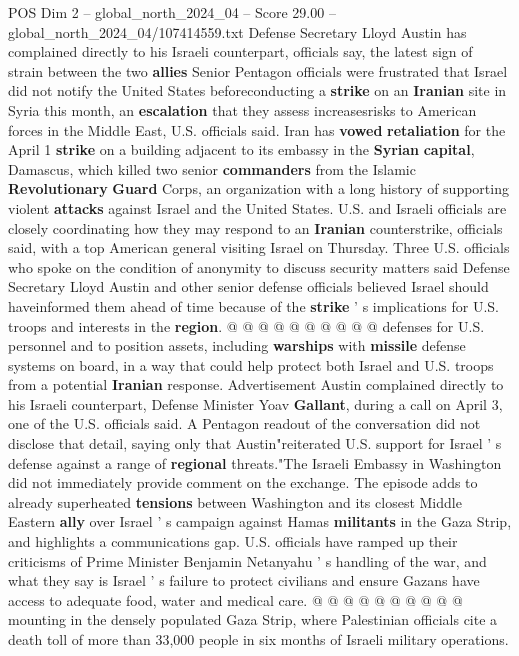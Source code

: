\begin{textsample}{POS Dim 2 – global\_north\_2024\_04 – Score 29.00 – global\_north\_2024\_04/107414559.txt}  \label{ex:f2_pos_167}
Defense Secretary Lloyd Austin has complained directly to his Israeli counterpart, officials say, the latest sign of strain between the two \textbf{allies} Senior Pentagon officials were frustrated that Israel did not notify the United States beforeconducting a \textbf{strike} on an \textbf{Iranian} site in Syria this month, an \textbf{escalation} that they assess increasesrisks to American forces in the Middle East, U.S. officials said.
Iran has \textbf{vowed} \textbf{retaliation} for the April 1 \textbf{strike} on a building adjacent to its embassy in the \textbf{Syrian} \textbf{capital}, Damascus, which killed two senior \textbf{commanders} from the Islamic \textbf{Revolutionary} \textbf{Guard} Corps, an organization with a long history of supporting violent \textbf{attacks} against Israel and the United States.
U.S. and Israeli officials are closely coordinating how they may respond to an \textbf{Iranian} counterstrike, officials said, with a top American general visiting Israel on Thursday.
Three U.S. officials who spoke on the condition of anonymity to discuss security matters said Defense Secretary Lloyd Austin and other senior defense officials believed Israel should haveinformed them ahead of time because of the \textbf{strike} ' s implications for U.S. troops and interests in the \textbf{region}. @ @ @ @ @ @ @ @ @ @ defenses for U.S. personnel and to position assets, including \textbf{warships} with \textbf{missile} defense systems on board, in a way that could help protect both Israel and U.S. troops from a potential \textbf{Iranian} response.
Advertisement Austin complained directly to his Israeli counterpart, Defense Minister Yoav \textbf{Gallant}, during a call on April 3, one of the U.S. officials said.
A Pentagon readout of the conversation did not disclose that detail, saying only that Austin"reiterated U.S. support for Israel ' s defense against a range of \textbf{regional} threats."The Israeli Embassy in Washington did not immediately provide comment on the exchange.
The episode adds to already superheated \textbf{tensions} between Washington and its closest Middle Eastern \textbf{ally} over Israel ' s campaign against Hamas \textbf{militants} in the Gaza Strip, and highlights a communications gap.
U.S. officials have ramped up their criticisms of Prime Minister Benjamin Netanyahu ' s handling of the war, and what they say is Israel ' s failure to protect civilians and ensure Gazans have access to adequate food, water and medical care. @ @ @ @ @ @ @ @ @ @ mounting in the densely populated Gaza Strip, where Palestinian officials cite a death toll of more than 33,000 people in six months of Israeli military operations.

\end{textsample}
